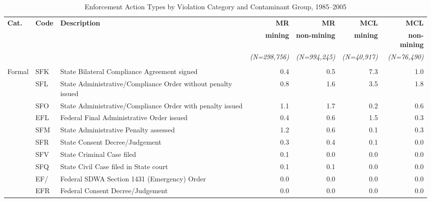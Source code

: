 
\begin{table}[htbp]
\centering
\caption{Enforcement Action Types by Violation Category and Contaminant Group, 1985--2005}
\label{tab:enf_action_type}
\small
\begin{tabular}{llp{5.8cm}rrrr}
\hline\hline
\textbf{Cat.} & \textbf{Code} & \textbf{Description} & \textbf{MR} & \textbf{MR} & \textbf{MCL} & \textbf{MCL} \\
 & & & \textbf{mining} & \textbf{non-mining} & \textbf{mining} & \textbf{non-mining} \\
 & & & \textit{(N=298,756)} & \textit{(N=994,245)} & \textit{(N=40,917)} & \textit{(N=76,490)} \\
\hline
\addlinespace[4pt]
\multicolumn{7}{l}{\textit{Formal enforcement}} \\
\addlinespace[2pt]
Formal & SFK & State Bilateral Compliance Agreement signed & 0.4 & 0.5 & 7.3 & 1.0 \\
 & SFL & State Administrative/Compliance Order without penalty issued & 0.8 & 1.6 & 3.5 & 1.8 \\
 & SFO & State Administrative/Compliance Order with penalty issued & 1.1 & 1.7 & 0.2 & 0.6 \\
 & EFL & Federal Final Administrative Order issued & 0.4 & 0.6 & 1.5 & 0.3 \\
 & SFM & State Administrative Penalty assessed & 1.2 & 0.6 & 0.1 & 0.3 \\
 & SFR & State Consent Decree/Judgement & 0.3 & 0.4 & 0.1 & 0.0 \\
 & SFV & State Criminal Case filed & 0.1 & 0.0 & 0.0 & 0.0 \\
 & SFQ & State Civil Case filed in State court & 0.1 & 0.1 & 0.0 & 0.0 \\
 & EF/ & Federal SDWA Section 1431 (Emergency) Order & 0.0 & 0.0 & 0.0 & 0.0 \\
 & EFR & Federal Consent Decree/Judgement & 0.0 & 0.0 & 0.0 & 0.0 \\

\end{tabular}
\end{table}
